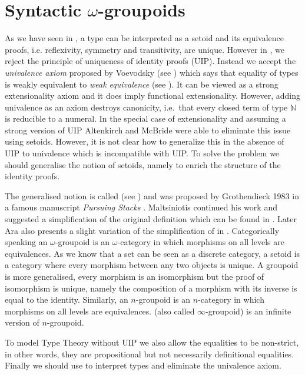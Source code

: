 \chapter{Syntactic $\omega$-groupoids}
\label{wog}


As we have seen in , a type can be interpreted as a setoid and its equivalence proofs, i.e.  reflexivity, symmetry and transitivity, are unique. 
However in \hott, we reject the principle of uniqueness of identity proofs (UIP). 
Instead we accept the \emph{univalence axiom} proposed by Voevodsky (see ) which says that equality of types is weakly equivalent to \emph{weak equivalence} (see ). 
It can be viewed as a strong extensionality axiom and it does imply functional extensionality. However, adding
univalence as an axiom destroys canonicity, i.e.\ that every closed
term of type $\mathbb{N}$ is reducible to a numeral. In the special
case of extensionality and assuming a strong version of UIP Altenkirch and McBride were able to eliminate this issue
\cite{alti:lics99,alti:ott-conf} using setoids. However, it is not
clear how to generalize this in the absence of UIP to univalence which
is incompatible with UIP. To solve the problem we should generalise
the notion of setoids, namely to enrich the structure of the identity
proofs.


The generalised notion is called \emph{\wogs} (see ) and was proposed by
Grothendieck 1983 in a famous manuscript \emph{Pursuing Stacks} \cite{gro:ps}. Maltsiniotis continued his work and suggested a simplification of the original definition which can be found in \cite{mal:gwog}. Later Ara also presents a slight variation of the simplification of {\wog} in \cite{ara:wog}. Categorically speaking an $\omega$-groupoid is an $\omega$-category in which morphisms on all levels are equivalences. As we know that a set can be seen as a discrete
category, a setoid is a category where every morphism between
any two objects is unique. A groupoid is more generalised, every morphism is
an isomorphism but the proof of isomorphism is unique, namely the
composition of a morphism with its inverse is equal to the identity. Similarly, an
$n$-groupoid is an $n$-category in which morphisms on all levels are
equivalences. {\wogs} (also called $\infty$-groupoid) is an
infinite version of $n$-groupoid. 

 To model Type Theory without UIP we
also allow the equalities to be non-strict, in other words, they are
propositional but not necessarily definitional equalities. Finally we should use {\wog} to interpret types and eliminate the univalence axiom.

